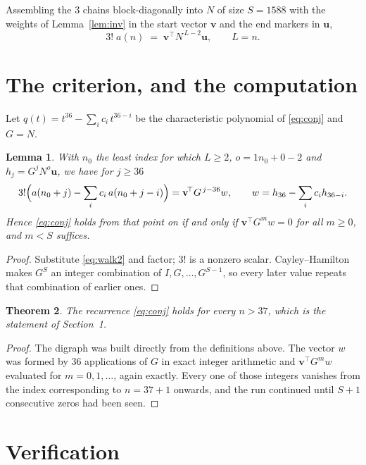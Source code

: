\documentclass[11pt,a4paper]{article}
\theoremstyle{plain}
\newtheorem{theorem}{Theorem}
\newtheorem{lemma}[theorem]{Lemma}
\theoremstyle{definition}
\begin{document}
Assembling the $3$ chains block-diagonally into $N$ of size $S=1588$ with the weights of
Lemma~\ref{lem:inv} in the start vector $\mathbf{v}$ and the end markers in
$\mathbf{u}$,
\begin{equation}\label{eq:walk2}
3!\;a(n)\;=\;\mathbf{v}^{\!\top}N^{\,L-2}\mathbf{u},\qquad L=n .
\end{equation}

\section{The criterion, and the computation}

Let $q(t)=t^{36}-\sum_i c_i\,t^{36-i}$ be the characteristic polynomial of
\eqref{eq:conj} and $G=N$.

\begin{lemma}\label{lem:crit}
With $n_0$ the least index for which $L\ge2$, $o=1n_0+0-2$ and
$h_j=G^{j}N^{o}\mathbf{u}$, we have for $j\ge36$
\[
3!\Bigl(a(n_0+j)-\sum_i c_i\,a(n_0+j-i)\Bigr)=\mathbf{v}^{\!\top}G^{\,j-36}w,
\qquad w=h_{36}-\sum_i c_i h_{36-i} .
\]
Hence \eqref{eq:conj} holds from that point on if and only if
$\mathbf{v}^{\!\top}G^{m}w=0$ for all $m\ge0$, and $m<S$ suffices.
\end{lemma}

\begin{proof}
Substitute \eqref{eq:walk2} and factor; $3!$ is a nonzero scalar. Cayley--Hamilton
makes $G^{S}$ an integer combination of $I,G,\dots,G^{S-1}$, so every later value repeats
that combination of earlier ones.
\end{proof}

\begin{theorem}
The recurrence \eqref{eq:conj} holds for every $n>37$, which is the statement of
Section~1.
\end{theorem}

\begin{proof}
The digraph was built directly from the definitions above. The vector $w$ was formed by
$36$ applications of $G$ in exact integer arithmetic and $\mathbf{v}^{\!\top}G^{m}w$
evaluated for $m=0,1,\dots$, again exactly. Every one of those integers vanishes from the
index corresponding to $n=37+1$ onwards, and the run continued until $S+1$ consecutive
zeros had been seen.
\end{proof}

\section{Verification}
\end{document}
